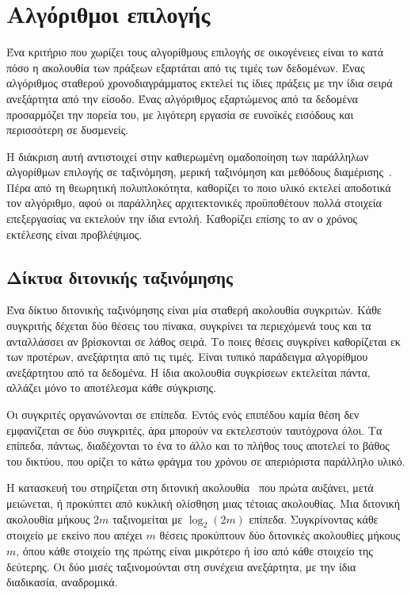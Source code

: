 \section{Αλγόριθμοι επιλογής}
\label{sec:bg-algorithms}

Ένα κριτήριο που χωρίζει τους αλγορίθμους επιλογής σε οικογένειες είναι το κατά
πόσο η ακολουθία των πράξεων εξαρτάται από τις τιμές των δεδομένων. Ένας
αλγόριθμος σταθερού χρονοδιαγράμματος εκτελεί τις ίδιες πράξεις με την ίδια
σειρά ανεξάρτητα από την είσοδο. Ένας αλγόριθμος εξαρτώμενος από τα δεδομένα
προσαρμόζει την πορεία του, με λιγότερη εργασία σε ευνοϊκές εισόδους και
περισσότερη σε δυσμενείς.

Η διάκριση αυτή αντιστοιχεί στην καθιερωμένη ομαδοποίηση των παράλληλων
αλγορίθμων επιλογής σε ταξινόμηση, μερική ταξινόμηση και μεθόδους
διαμέρισης~\cite{zhang2023gputopk}. Πέρα από τη θεωρητική πολυπλοκότητα,
καθορίζει το ποιο υλικό εκτελεί αποδοτικά τον αλγόριθμο, αφού οι παράλληλες
αρχιτεκτονικές προϋποθέτουν πολλά στοιχεία επεξεργασίας να εκτελούν την ίδια
εντολή. Καθορίζει επίσης το αν ο χρόνος εκτέλεσης είναι προβλέψιμος.

\subsection{Δίκτυα διτονικής ταξινόμησης}
\label{sec:bg-bitonic}

Ένα δίκτυο διτονικής ταξινόμησης είναι μία σταθερή ακολουθία συγκριτών. Κάθε
συγκριτής δέχεται δύο θέσεις του πίνακα, συγκρίνει τα περιεχόμενά τους και τα
ανταλλάσσει αν βρίσκονται σε λάθος σειρά. Το ποιες θέσεις συγκρίνει καθορίζεται
εκ των προτέρων, ανεξάρτητα από τις τιμές. Είναι τυπικό παράδειγμα αλγορίθμου
ανεξάρτητου από τα δεδομένα. Η ίδια ακολουθία συγκρίσεων εκτελείται πάντα,
αλλάζει μόνο το αποτέλεσμα κάθε σύγκρισης.

Οι συγκριτές οργανώνονται σε επίπεδα. Εντός ενός επιπέδου καμία θέση δεν
εμφανίζεται σε δύο συγκριτές, άρα μπορούν να εκτελεστούν ταυτόχρονα όλοι. Τα
επίπεδα, πάντως, διαδέχονται το ένα το άλλο και το πλήθος τους αποτελεί το
βάθος του δικτύου, που ορίζει το κάτω φράγμα του χρόνου σε απεριόριστα
παράλληλο υλικό.

Η κατασκευή του  στηρίζεται στη διτονική
ακολουθία~\cite{batcher1968} που πρώτα αυξάνει, μετά μειώνεται, ή προκύπτει από
κυκλική ολίσθηση μιας τέτοιας ακολουθίας. Μια διτονική ακολουθία μήκους $2m$
ταξινομείται με $\log_2(2m)$ επίπεδα. Συγκρίνοντας κάθε στοιχείο με εκείνο που
απέχει $m$ θέσεις προκύπτουν δύο διτονικές ακολουθίες μήκους $m$, όπου κάθε
στοιχείο της πρώτης είναι μικρότερο ή ίσο από κάθε στοιχείο της δεύτερης. Οι
δύο μισές ταξινομούνται στη συνέχεια ανεξάρτητα, με την ίδια διαδικασία,
αναδρομικά.

